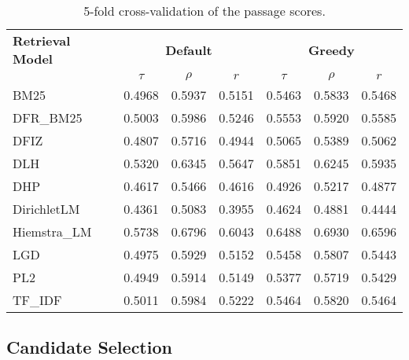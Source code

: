 \begin{table}[h!]
    \centering
    \caption{5-fold cross-validation of the passage scores.}
    \begin{tabular}{lcccccc}
        \toprule
        \textbf{Retrieval Model} & \multicolumn{3}{c}{\textbf{Default}} & \multicolumn{3}{c}{\textbf{Greedy}} \\
        \cmidrule(lr){2-4} \cmidrule(lr){5-7}
                                 & $\tau$ & $\rho$ & $r$ & $\tau$ & $\rho$ & $r$ \\
        \midrule

        BM25         & 0.4968 & 0.5937 & 0.5151 & 0.5463 & 0.5833 & 0.5468 \\
        DFR\_BM25    & 0.5003 & 0.5986 & 0.5246 & 0.5553 & 0.5920 & 0.5585 \\
        DFIZ         & 0.4807 & 0.5716 & 0.4944 & 0.5065 & 0.5389 & 0.5062 \\
        DLH          & 0.5320 & 0.6345 & 0.5647 & 0.5851 & 0.6245 & 0.5935 \\
        DHP          & 0.4617 & 0.5466 & 0.4616 & 0.4926 & 0.5217 & 0.4877 \\
        DirichletLM  & 0.4361 & 0.5083 & 0.3955 & 0.4624 & 0.4881 & 0.4444 \\
        Hiemstra\_LM & 0.5738 & 0.6796 & 0.6043 & 0.6488 & 0.6930 & 0.6596 \\
        LGD          & 0.4975 & 0.5929 & 0.5152 & 0.5458 & 0.5807 & 0.5443 \\
        PL2          & 0.4949 & 0.5914 & 0.5149 & 0.5377 & 0.5719 & 0.5429 \\
        TF\_IDF      & 0.5011 & 0.5984 & 0.5222 & 0.5464 & 0.5820 & 0.5464 \\
        \bottomrule
    \end{tabular}
\end{table}

\subsection{Candidate Selection}\label{candidate-selection}

